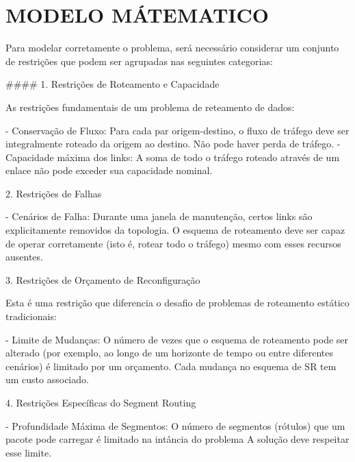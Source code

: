 \section{MODELO MÁTEMATICO}


Para modelar corretamente o problema, será necessário considerar um conjunto de restrições que podem ser agrupadas nas seguintes categorias:

#### 1. Restrições de Roteamento e Capacidade

As restrições fundamentais de um problema de reteamento de dados:

- Conservação de Fluxo: Para cada par origem-destino, o fluxo de tráfego deve ser integralmente roteado da origem ao destino. Não pode haver perda de tráfego.
- Capacidade máxima dos links: A soma de todo o tráfego roteado através de um enlace não pode exceder sua capacidade nominal.

2. Restrições de Falhas

- Cenários de Falha: Durante uma janela de manutenção, certos links são explicitamente removidos da topologia. O esquema de roteamento deve ser capaz de operar corretamente (isto é, rotear todo o tráfego) mesmo com esses recursos ausentes.

3. Restrições de Orçamento de Reconfiguração

Esta é uma restrição que diferencia o desafio de problemas de roteamento estático tradicionais:

- Limite de Mudanças: O número de vezes que o esquema de roteamento pode ser alterado (por exemplo, ao longo de um horizonte de tempo ou entre diferentes cenários) é limitado por um orçamento. Cada mudança no esquema de SR tem um custo associado.

4. Restrições Específicas do Segment Routing

- Profundidade Máxima de Segmentos: O número de segmentos (rótulos) que um pacote pode carregar é limitado na intância do problema A solução deve respeitar esse limite.
